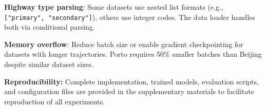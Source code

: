 \textbf{Highway type parsing}: Some datasets use nested list formats (e.g., \texttt{["primary", "secondary"]}), others use integer codes. The data loader handles both via conditional parsing.

\textbf{Memory overflow}: Reduce batch size or enable gradient checkpointing for datasets with longer trajectories. Porto requires 50\% smaller batches than Beijing despite similar dataset sizes.

\textbf{Reproducibility:} Complete implementation, trained models, evaluation scripts, and configuration files are provided in the supplementary materials to facilitate reproduction of all experiments.

